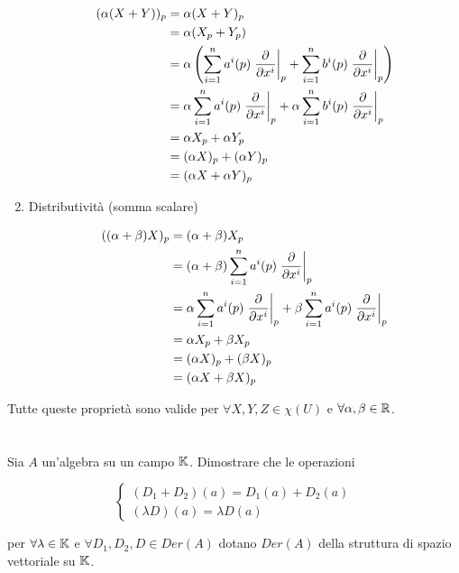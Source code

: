 \begin{enumerate}
		\begin{align}
			\begin{split}
				(\alpha (X + Y))_{p} &= \alpha (X + Y)_{p}\\
				&= \alpha (X_{p} + Y_{p})\\
				&= \alpha \left( \sum_{i=1}^{n} a^{i} (p) \eval{ \pdv{x^{i}} }_{p} + \sum_{i=1}^{n} b^{i} (p) \eval{ \pdv{x^{i}} }_{p} \right)\\
				&= \alpha \sum_{i=1}^{n} a^{i} (p) \eval{ \pdv{x^{i}} }_{p} + \alpha \sum_{i=1}^{n} b^{i} (p) \eval{ \pdv{x^{i}} }_{p}\\
				&= \alpha X_{p} + \alpha Y_{p}\\
				&= (\alpha X)_{p} + (\alpha Y)_{p}\\
				&= (\alpha X + \alpha Y)_{p}
			\end{split}
		\end{align}
	
	\item Distributività (somma scalare)
	
		\begin{align}
			\begin{split}
				((\alpha + \beta) X)_{p} &= (\alpha + \beta) X_{p}\\
				&= (\alpha + \beta) \sum_{i=1}^{n} a^{i} (p) \eval{ \pdv{x^{i}} }_{p}\\
				&= \alpha \sum_{i=1}^{n} a^{i} (p) \eval{ \pdv{x^{i}} }_{p} + \beta \sum_{i=1}^{n} a^{i} (p) \eval{ \pdv{x^{i}} }_{p}\\
				&= \alpha X_{p} + \beta X_{p}\\
				&= (\alpha X)_{p} + (\beta X)_{p}\\
				&= (\alpha X + \beta X)_{p} 
			\end{split}
		\end{align}
\end{enumerate}

Tutte queste proprietà sono valide per $ \forall X, Y, Z \in \chi(U) $ e $ \forall \alpha, \beta \in \mathbb{R} $.

\tocless\section{}\label{es1-10}

\begin{tcolorbox}
	Sia $ A $ un'algebra su un campo $ \mathbb{K} $. Dimostrare che le operazioni
	
	\begin{equation}
		\begin{cases}
			(D_{1}+D_{2})(a) = D_{1}(a) + D_{2}(a)\\
			(\lambda D)(a) = \lambda D(a)
		\end{cases}
	\end{equation}
	
	per $ \forall \lambda \in \mathbb{K} $ e $ \forall D_{1},D_{2},D \in Der(A) $ dotano $ Der(A) $ della struttura di spazio vettoriale su $ \mathbb{K} $.
\end{tcolorbox}

